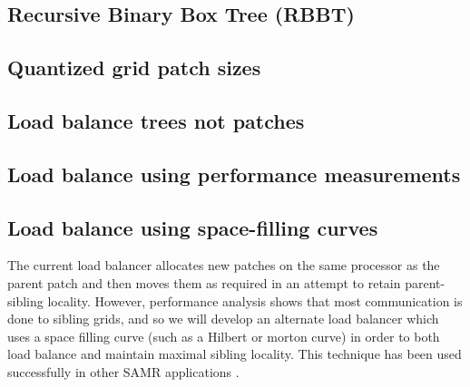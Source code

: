 \documentclass{article}
\begin{document}
\subsection{Recursive Binary Box Tree (RBBT)}  \label{solution:amr-boxtree}
\subsection{Quantized grid patch sizes} \label{solution:amr-grid-quantized}
\subsection{Load balance trees not patches} \label{solution:amr-balance-trees}

\subsection{Load balance using performance measurements}  \label{solution:amr-balance-performance}

\subsection{Load balance using space-filling curves}  \label{solution:amr-balance-hilbert}

The current load balancer allocates new patches on the same
processor as the parent patch and then moves them as required in an
attempt to retain parent-sibling locality.  However, performance
analysis shows that most communication is done to sibling grids, and
so we will develop an alternate load balancer which uses a space
filling curve (such as a Hilbert or morton curve) in order to both
load balance and maintain maximal sibling locality.  This technique
has been used successfully in other SAMR applications
\cite{WHH03,LWBH07}.


\end{document}

